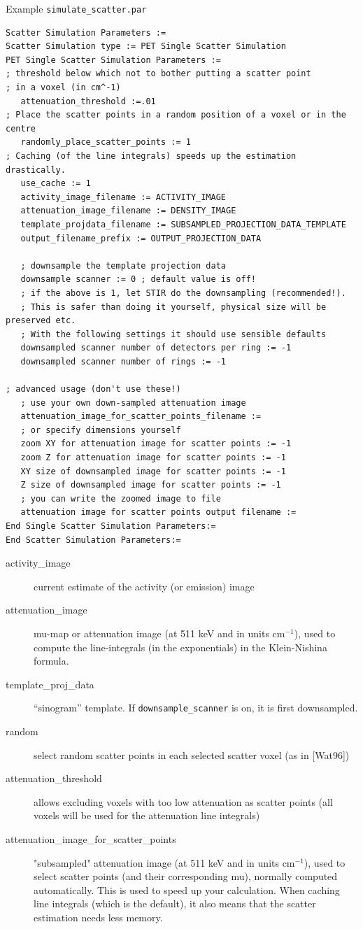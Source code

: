 \documentclass{article}
\begin{document}
Example \texttt{simulate\_scatter.par}
\begin{verbatim}
Scatter Simulation Parameters :=
Scatter Simulation type := PET Single Scatter Simulation
PET Single Scatter Simulation Parameters :=
; threshold below which not to bother putting a scatter point
; in a voxel (in cm^-1)
   attenuation_threshold :=.01
; Place the scatter points in a random position of a voxel or in the centre
   randomly_place_scatter_points := 1
; Caching (of the line integrals) speeds up the estimation drastically.
   use_cache := 1
   activity_image_filename := ACTIVITY_IMAGE
   attenuation_image_filename := DENSITY_IMAGE
   template_projdata_filename := SUBSAMPLED_PROJECTION_DATA_TEMPLATE
   output_filename_prefix := OUTPUT_PROJECTION_DATA

   ; downsample the template projection data
   downsample scanner := 0 ; default value is off!
   ; if the above is 1, let STIR do the downsampling (recommended!).
   ; This is safer than doing it yourself, physical size will be preserved etc.
   ; With the following settings it should use sensible defaults
   downsampled scanner number of detectors per ring := -1
   downsampled scanner number of rings := -1

; advanced usage (don't use these!)
   ; use your own down-sampled attenuation image
   attenuation_image_for_scatter_points_filename :=
   ; or specify dimensions yourself
   zoom XY for attenuation image for scatter points := -1
   zoom Z for attenuation image for scatter points := -1
   XY size of downsampled image for scatter points := -1
   Z size of downsampled image for scatter points := -1
   ; you can write the zoomed image to file
   attenuation image for scatter points output filename :=
End Single Scatter Simulation Parameters:=
End Scatter Simulation Parameters:=
\end{verbatim}
\begin{description}
\item[activity\_image]
current estimate of the activity (or emission) image
\item[attenuation\_image] mu-map or attenuation image (at 511 keV and in units cm$^{-1}$),
used to compute the line-integrals (in the exponentials) in the Klein-Nishina formula.
\item[template\_proj\_data]
``sinogram'' template. If \texttt{downsample\_scanner} is on, it
is first downsampled.
\item[random]
select random scatter points in each selected scatter voxel (as in [Wat96])
\item[attenuation\_threshold]
allows excluding voxels with too low attenuation as scatter points (all voxels will be used for the attenuation line integrals)
\item[attenuation\_image\_for\_scatter\_points] "subsampled" attenuation image (at 511 keV and in units cm${}^{-1}$), 
used to select scatter points (and their corresponding mu),
normally computed automatically. This is used to speed up your
 calculation. When caching line integrals (which is the default), it also means that the scatter estimation
 needs less memory.
\end{description}
\end{document}
